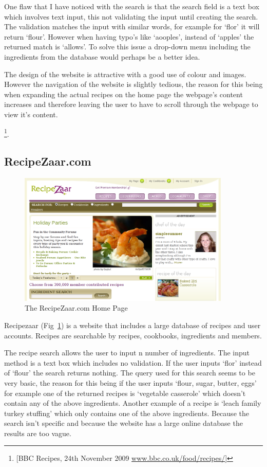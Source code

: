 One flaw that I have noticed with the search is that the search field is a text box which involves text input, this not validating the input until creating the search. The validation matches the input with similar words, for example for ‘flor’ it will return ‘flour’. However when having typo’s like ‘aooples’, instead of ‘apples’ the returned match is ‘allows’. To solve this issue a drop-down menu including the ingredients from the database would perhaps be a better idea.

The design of the website is attractive with a good use of colour and images. However the navigation of the website is slightly tedious, the reason for this being when expanding the actual recipes on the home page the webpage’s content increases and therefore leaving the user to have to scroll through the webpage to view it’s content. 

\footnote{[BBC Recipes, 24th November 2009 \url{www.bbc.co.uk/food/recipes/}]}.

\subsection{RecipeZaar.com}

\begin{figure}[h]
\includegraphics[width=0.9\textwidth]{screenshot_recipezaar}
\caption{The RecipeZaar.com Home Page}
\label{fig:recipezaar}
\end{figure}

Recipezaar (Fig~\ref{fig:recipezaar}) is a website that includes a large database of recipes and user accounts. Recipes are searchable by recipes, cookbooks, ingredients and members. 

The recipe search allows the user to input n number of ingredients. The input method is a text box which includes no validation. If the user inputs ‘flor’ instead of ‘flour’ the search returns nothing. The query used for this search seems to be very basic, the reason for this being if the user inputs ‘flour, sugar, butter, eggs’ for example one of the returned recipes is ‘vegetable casserole’ which doesn’t contain any of the above ingredients. Another example of a recipe is ‘leach family turkey stuffing’ which only contains one of the above ingredients. Because the search isn’t specific and because the website has a large online database the results are too vague.

